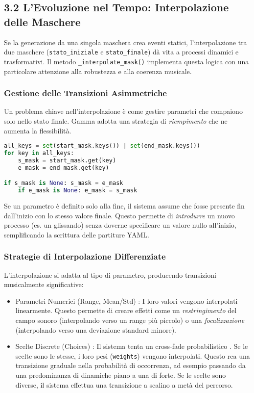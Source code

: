\subsection{3.2 L'Evoluzione nel Tempo: Interpolazione delle Maschere}
Se la generazione da una singola maschera crea eventi statici, l'interpolazione tra due maschere (\texttt{stato\_iniziale} e \texttt{stato\_finale}) dà vita a processi dinamici e trasformativi. Il metodo \texttt{\_interpolate\_mask()} implementa questa logica con una particolare attenzione alla robustezza e alla coerenza musicale.
\subsubsection{Gestione delle Transizioni Asimmetriche}
Un problema chiave nell'interpolazione è come gestire parametri che compaiono solo nello stato finale. Gamma adotta una strategia di \textit{riempimento} che ne aumenta la flessibilità.

\begin{lstlisting}[language=Python]
all_keys = set(start_mask.keys()) | set(end_mask.keys())
for key in all_keys:
    s_mask = start_mask.get(key)
    e_mask = end_mask.get(key)

if s_mask is None: s_mask = e_mask
    if e_mask is None: e_mask = s_mask
\end{lstlisting}
Se un parametro è definito solo alla fine, il sistema assume che fosse presente fin dall'inizio con lo stesso valore finale. Questo permette di \textit{introdurre} un nuovo processo (es. un glissando) senza doverne specificare un valore nullo all'inizio, semplificando la scrittura delle partiture YAML.
\subsubsection{Strategie di Interpolazione Differenziate}
L'interpolazione si adatta al tipo di parametro, producendo transizioni musicalmente significative:

\begin{itemize}
    \item Parametri Numerici (Range, Mean/Std) : I loro valori vengono interpolati linearmente. Questo permette di creare effetti come un \textit{restringimento} del campo sonoro (interpolando verso un range più piccolo) o una \textit{focalizzazione} (interpolando verso una deviazione standard minore).
\end{itemize}

\begin{itemize}
    \item Scelte Discrete (Choices) : Il sistema tenta un  cross-fade probabilistico . Se le scelte sono le stesse, i loro pesi (\texttt{weights}) vengono interpolati. Questo rea una transizione graduale nella probabilità di occorrenza, ad esempio passando da una predominanza di dinamiche piano a una di forte. Se le scelte sono diverse, il sistema effettua una transizione a scalino a metà del percorso.
\end{itemize}

